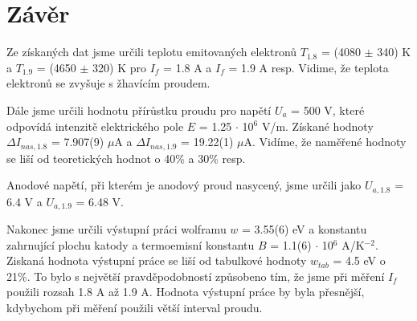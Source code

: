 \documentclass[a4paper,11pt]{article}
\begin{document}
\begin{minipage}[t]{0.5\textwidth}
        \section{Závěr}  
                Ze získaných dat jsme určili teplotu emitovaných elektronů $T_{1.8}$ = (4080 $\pm$ 340) K a $T_{1.9}$ = (4650 $\pm$ 320) K pro $I_f$ = 1.8 A a $I_f$ = 1.9 A resp. Vidime, že teplota elektronů se zvyšuje s žhavícím proudem.
                \par Dále jsme určili hodnotu přírůstku proudu pro napětí $U_a$ = 500 V, které odpovídá intenzitě elektrického pole $E$ = 1.25 $\cdot$ 10$^6$ V/m. Získané hodnoty $\Delta I_{nas, 1.8}$ = 7.907(9) $\mu$A a $\Delta I_{nas, 1.9}$ = 19.22(1) $\mu$A. Vidíme, že naměřené hodnoty se liší od teoretických hodnot o 40\% a 30\% resp. 
                \par Anodové napětí, při kterém je anodový proud nasycený, jsme určili jako $U_{a, 1.8}$ = 6.4 V a $U_{a, 1.9}$ = 6.48 V.
                \par Nakonec jsme určili výstupní práci wolframu $w$ = 3.55(6) eV a konstantu zahrnující plochu katody a termoemisní konstantu $B$ = 1.1(6) $\cdot$ 10$^6$ A/K$^{-2}$. Ziskaná hodnota výstupní práce se liší od tabulkové hodnoty $w_{tab}$ = 4.5 eV o 21\%.  To bylo s největší pravděpodobností způsobeno tím, že jsme při měření $I_f$ použili rozsah 1.8 A až 1.9 A. Hodnota výstupní práce by byla přesnější, kdybychom při měření použili větší interval proudu. 
    \end{minipage}
\newpage
\end{document}
